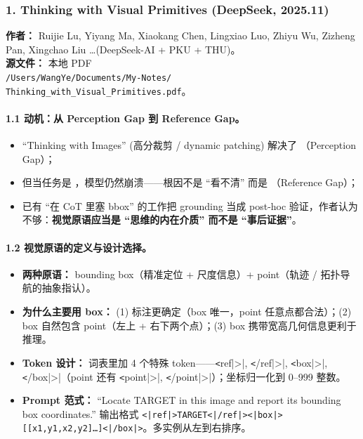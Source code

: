 \subsubsection*{1. Thinking with Visual Primitives (DeepSeek, 2025.11)}

\textbf{作者：} Ruijie Lu, Yiyang Ma, Xiaokang Chen, Lingxiao Luo, Zhiyu Wu, Zizheng Pan, Xingchao Liu \dots (DeepSeek-AI + PKU + THU)。\\
\textbf{源文件：} 本地 PDF \\
\texttt{\small /Users/WangYe/Documents/My-Notes/}\\
\texttt{\small Thinking\_with\_Visual\_Primitives.pdf}。

\paragraph{1.1 动机：从 Perception Gap 到 Reference Gap。}

\begin{itemize}[leftmargin=1.5em]
  \item ``Thinking with Images'' (高分裁剪 / dynamic patching) 解决了 （Perception Gap）；
  \item 但当任务是 ，模型仍然崩溃——根因不是 ``看不清'' 而是 （Reference Gap）；
  \item 已有 ``在 CoT 里塞 bbox'' 的工作把 grounding 当成 post-hoc 验证，作者认为不够：\textbf{视觉原语应当是 ``思维的内在介质'' 而不是 ``事后证据''}。
\end{itemize}

\paragraph{1.2 视觉原语的定义与设计选择。}

\begin{itemize}[leftmargin=1.5em]
  \item \textbf{两种原语：} bounding box（精准定位 + 尺度信息）+ point（轨迹 / 拓扑导航的抽象指认）。
  \item \textbf{为什么主要用 box：} (1) 标注更确定（box 唯一，point 任意点都合法）；(2) box 自然包含 point（左上 + 右下两个点）；(3) box 携带宽高几何信息更利于推理。
  \item \textbf{Token 设计：} 词表里加 4 个特殊 token——\verb|<|ref|>|, \verb|<|/ref|>|, \verb|<|box|>|, \verb|<|/box|>|（point 还有 \verb|<|point|>|, \verb|<|/point|>|）；坐标归一化到 0–999 整数。
  \item \textbf{Prompt 范式：} ``Locate TARGET in this image and report its bounding box coordinates.'' 输出格式 \texttt{<|ref|>TARGET<|/ref|><|box|>[[x1,y1,x2,y2]\dots]<|/box|>}。多实例从左到右排序。
\end{itemize}

